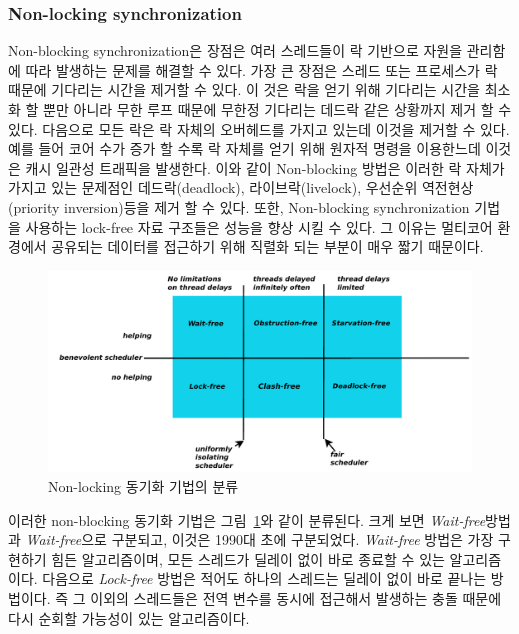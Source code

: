 \subsubsection{Non-locking synchronization}

Non-blocking synchronization은 장점은 여러 스레드들이 락 기반으로 자원을 관리함에 따라
 발생하는 문제를 해결할 수 있다. 
가장 큰 장점은 스레드 또는 프로세스가 락 때문에 기다리는 시간을 제거할 수 있다.
이 것은 락을 얻기 위해 기다리는 시간을 최소화 할 뿐만 아니라 무한 루프 때문에 무한정 기다리는 
데드락 같은 상황까지 제거 할 수 있다. 
다음으로 모든 락은 락 자체의 오버헤드를 가지고 있는데 이것을 제거할 수 있다. 
예를 들어 코어 수가 증가 할 수록 락 자체를 얻기 위해 원자적 명령을 이용한느데 이것은 캐시 일관성 트래픽을 
발생한다. 
이와 같이 Non-blocking 방법은 이러한 락 자체가 가지고 있는 문제점인 데드락(deadlock), 라이브락(livelock), 
우선순위 역전현상(priority inversion)등을 제거 할 수 있다. 
또한, Non-blocking synchronization 기법을 사용하는 lock-free 자료 구조들은 성능을 향상 시킬 수 있다. 
그 이유는 멀티코어 환경에서 공유되는 데이터를 접근하기 위해 직렬화 되는 부분이 매우 짧기 때문이다. 


\begin{figure}[h!]
    \centering
    \includegraphics[width=1\textwidth]{fig/NBS/NBS}
    \caption{Non-locking 동기화 기법의 분류}
  \label{fig:NBS}
\end{figure}


이러한 non-blocking 동기화 기법은 그림~\ref{fig:NBS}와 같이 분류된다.
크게 보면 \textit{Wait-free}방법과 \textit{Wait-free}으로 구분되고, 이것은 1990대 초에 
구분되었다.  
\textit{Wait-free} 방법은 가장 구현하기 힘든 알고리즘이며, 
모든 스레드가 딜레이 없이 바로 종료할 수 있는 알고리즘이다. 
다음으로 \textit{Lock-free} 방법은 적어도 하나의 스레드는 딜레이 없이 
바로 끝나는 방법이다. 
즉 그 이외의 스레드들은 전역 변수를 동시에 접근해서 발생하는 충돌 때문에 다시 
순회할 가능성이 있는 알고리즘이다.

